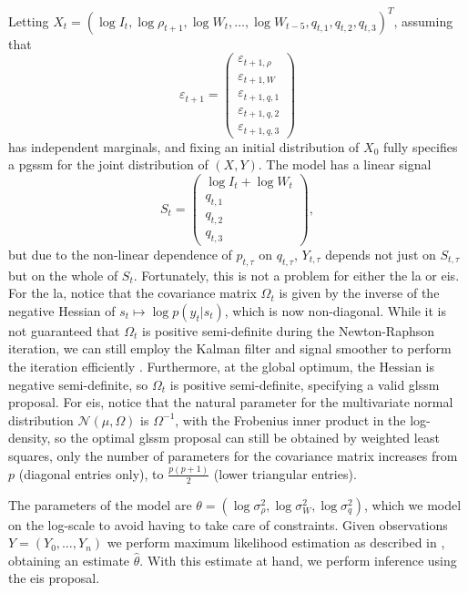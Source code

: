 Letting $X_{t} =\left( \log I_{t}, \log \rho_{t + 1}, \log W_{t}, \dots, \log W_{t - 5}, q_{t,1}, q_{t,2}, q_{t,3}\right)^{T}$, assuming that
$$
\varepsilon_{t + 1} = 
\begin{pmatrix}
     \varepsilon_{t + 1,\rho}\\ \varepsilon_{t + 1, W}\\ \varepsilon_{t +1, q, 1}\\ \varepsilon_{t +1, q, 2}\\ \varepsilon_{t +1, q, 3}
\end{pmatrix}
$$
has independent marginals, and fixing an initial distribution of $X_{0}$ fully specifies a \acrshort{pgssm} for the joint distribution of $(X,Y)$. The model has a linear signal 
$$
    S_{t} = \begin{pmatrix}
        \log I_{t} + \log W_{t} \\
        q_{t, 1} \\
        q_{t, 2} \\
        q_{t, 3} 
    \end{pmatrix},
$$
but due to the non-linear dependence of $p_{t,\tau}$ on $q_{t,\tau}$,  $Y_{t,\tau}$ depends not just on $S_{t, \tau}$ but on the whole of $S_{t}$. Fortunately, this is not a problem for either the \acrshort{la} or \acrshort{eis}. For the \acrshort{la}, notice that the covariance matrix $\Omega_{t}$ is given by the inverse of the negative Hessian of $s_{t} \mapsto \log p(y_{t}|s_{t})$, which is now non-diagonal. While it is not guaranteed that $\Omega_{t}$ is positive semi-definite during the Newton-Raphson iteration, we can still employ the Kalman filter and signal smoother to perform the iteration efficiently \citep{Jungbacker2007Monte}. Furthermore, at the global optimum, the Hessian is negative semi-definite, so $\Omega_{t}$ is positive semi-definite, specifying a valid \acrshort{glssm} proposal.  For \acrshort{eis}, notice that the natural parameter for the multivariate normal distribution $\mathcal N(\mu, \Omega)$ is $\Omega^{-1}$, with the Frobenius inner product in the log-density, so the optimal \acrshort{glssm} proposal can still be obtained by weighted least squares, only the number of parameters for the covariance matrix increases from $p$ (diagonal entries only), to $ \frac{p (p +1)}{2}$ (lower triangular entries). 

The parameters of the model are $\theta = \left( \log \sigma^{2}_{\rho}, \log \sigma^{2}_{W}, \log \sigma^{2}_{q} \right)$, which we model on the log-scale to avoid having to take care of constraints. Given observations $Y = (Y_{0}, \dots, Y_{n})$ we perform maximum likelihood estimation as described in , obtaining an estimate $\hat\theta$.
With this estimate at hand, we perform inference using the \acrshort{eis} proposal. 
%

